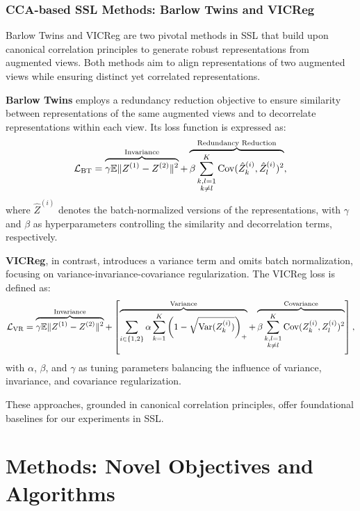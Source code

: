 \subsubsection{CCA-based SSL Methods: Barlow Twins and VICReg}
Barlow Twins and VICReg are two pivotal methods in SSL that build upon canonical correlation principles to generate robust representations from augmented views.
Both methods aim to align representations of two augmented views while ensuring distinct yet correlated representations.

\textbf{Barlow Twins} employs a redundancy reduction objective to ensure similarity between representations of the same augmented views and to decorrelate representations within each view.
Its loss function is expressed as:
\begin{align}
    \mathcal{L}_\text{BT} = \overbrace{\gamma \mathbb{E} \lVert Z^{(1)} - Z^{(2)}\rVert^2}^{\text{Invariance}} + \overbrace{\beta \sum_{\substack{k,l=1 \\ k \neq l}}^K \mathrm{Cov}(\hat{Z}^{(i)}_k, \hat{Z}^{(i)}_l)^2}^{\text{Redundancy Reduction}},
\end{align}
where \( \hat{Z}^{(i)} \) denotes the batch-normalized versions of the representations, with \( \gamma \) and \( \beta \) as hyperparameters controlling the similarity and decorrelation terms, respectively.

\textbf{VICReg}, in contrast, introduces a variance term and omits batch normalization, focusing on variance-invariance-covariance regularization.
The VICReg loss is defined as:
\begin{align}
    \mathcal{L}_\text{VR} = \overbrace{\gamma \mathbb{E} \lVert Z^{(1)} - Z^{(2)}\rVert^2}^{\text{Invariance}} + \left[\overbrace{\sum_{i \in \{1,2\}} \alpha \sum_{k=1}^K \left(1 - \sqrt{\mathrm{Var}(Z^{(i)}_k)}\right)_+}^{\text{Variance}} + \overbrace{\beta \sum_{\substack{k,l=1 \\ k \neq l}}^K \mathrm{Cov}(Z^{(i)}_k, Z^{(i)}_l)^2 }^{\text{Covariance}}\right],
\end{align}
with \( \alpha \), \( \beta \), and \( \gamma \) as tuning parameters balancing the influence of variance, invariance, and covariance regularization.

These approaches, grounded in canonical correlation principles, offer foundational baselines for our experiments in SSL.


\section{Methods: Novel Objectives and Algorithms}

